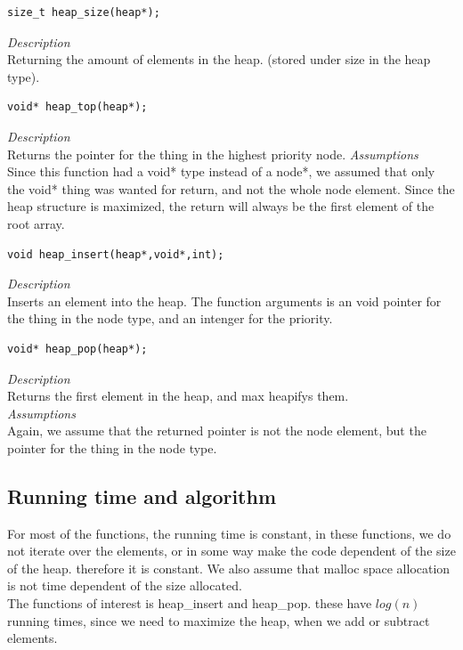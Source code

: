 \documentclass[11pt]{article}
\begin{document}
 \begin{lstlisting}[style=customc]
size_t heap_size(heap*);\end{lstlisting}

\textit{Description}\\
Returning the amount of elements in the heap. (stored under size in the heap type).\\




 \begin{lstlisting}[style=customc]
void* heap_top(heap*);\end{lstlisting}

\textit{Description}\\
Returns the pointer for the thing in the highest priority node.
\textit{Assumptions}\\
Since this function had a void* type instead of a node*, we assumed that only the void* thing was wanted for return, and not the whole node element. Since the heap structure is maximized, the return will always be the first element of the root array.\\


\begin{lstlisting}[style=customc]
void heap_insert(heap*,void*,int); \end{lstlisting}
\textit{Description}\\
Inserts an element into the heap. The function arguments is an void pointer for the thing in the node type, and an intenger for the priority.\\



\begin{lstlisting}[style=customc]
void* heap_pop(heap*);\end{lstlisting}
\textit{Description}\\
Returns the first element in the heap, and max heapifys them.\\
\textit{Assumptions}\\
Again, we assume that the returned pointer is not the node element, but the pointer for the thing in the node type.\\

\subsection*{Running time and algorithm}
For most of the functions, the running time is constant, in these functions, we do not iterate over the elements, or in some way make the code dependent of the size of the heap. therefore it is constant. We also assume that malloc space allocation is not time dependent of the size allocated.
\\
The functions of interest is heap\_insert and heap\_pop. these have $log(n)$ running times, since we need to maximize the heap, when we add or subtract elements.
\end{document}
